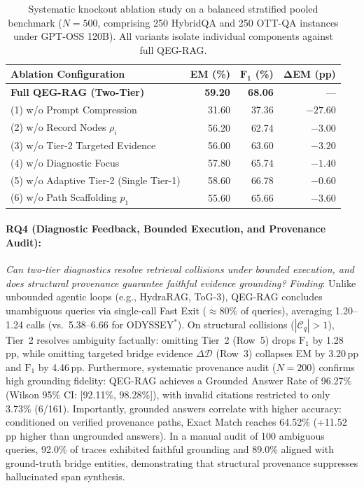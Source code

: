 \documentclass[runningheads]{llncs}
\begin{document}
\begin{table}[t]
\caption{Systematic knockout ablation study on a balanced stratified pooled benchmark ($N=500$, comprising 250 HybridQA and 250 OTT-QA instances under GPT-OSS 120B). All variants isolate individual components against full QEG-RAG.}
\label{tab:ablation}
\vspace{0.5mm}
\centering
\scriptsize
\renewcommand{\arraystretch}{0.78}
\setlength{\tabcolsep}{8pt}
\begin{tabular}{@{}lrrr@{}}
\toprule
\textbf{Ablation Configuration} & \textbf{EM (\%)} & $\mathbf{F_1}$ \textbf{(\%)} & $\mathbf{\Delta}$\textbf{EM (pp)} \\
\midrule
\textbf{Full QEG-RAG (Two-Tier)} & \textbf{59.20} & \textbf{68.06} & --- \\
\midrule
(1) w/o Prompt Compression       & 31.60 & 37.36 & $-27.60$ \\
(2) w/o Record Nodes $\rho_i$    & 56.20 & 62.74 & $-3.00$  \\
(3) w/o Tier-2 Targeted Evidence & 56.00 & 63.60 & $-3.20$  \\
(4) w/o Diagnostic Focus         & 57.80 & 65.74 & $-1.40$  \\
(5) w/o Adaptive Tier-2 (Single Tier-1) & 58.60 & 66.78 & $-0.60$  \\
(6) w/o Path Scaffolding $p_1$       & 55.60 & 65.66 & $-3.60$  \\
\bottomrule
\end{tabular}
\vspace{0.5mm}
\end{table}

\paragraph{RQ4 (Diagnostic Feedback, Bounded Execution, and Provenance Audit):}
\emph{Can two-tier diagnostics resolve retrieval collisions under bounded execution, and does structural provenance guarantee faithful evidence grounding?} \emph{Finding}: Unlike unbounded agentic loops (e.g., HydraRAG, ToG-3), QEG-RAG concludes unambiguous queries via single-call Fast Exit ($\approx 80\%$ of queries), averaging 1.20--1.24 calls (vs.\ 5.38--6.66 for ODYSSEY$^*$). On structural collisions ($|\mathcal{C}_q| > 1$), Tier~2 resolves ambiguity factually: omitting Tier~2 (Row~5) drops $\text{F}_1$ by 1.28\,pp, while omitting targeted bridge evidence $\Delta\mathcal{D}$ (Row~3) collapses EM by 3.20\,pp and $\text{F}_1$ by 4.46\,pp. Furthermore, systematic provenance audit ($N=200$) confirms high grounding fidelity: QEG-RAG achieves a Grounded Answer Rate of 96.27\% (Wilson 95\% CI: [92.11\%, 98.28\%]), with invalid citations restricted to only 3.73\% (6/161). Importantly, grounded answers correlate with higher accuracy: conditioned on verified provenance paths, Exact Match reaches 64.52\% (+11.52\,pp higher than ungrounded answers). In a manual audit of 100 ambiguous queries, 92.0\% of traces exhibited faithful grounding and 89.0\% aligned with ground-truth bridge entities, demonstrating that structural provenance suppresses hallucinated span synthesis.
\end{document}
